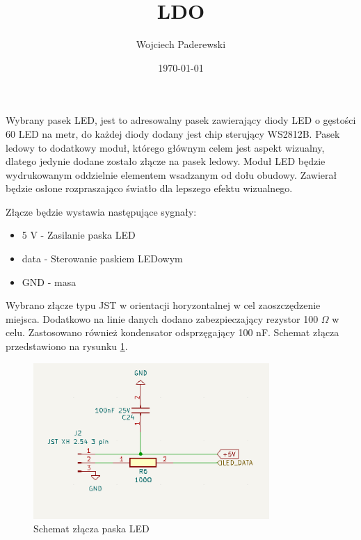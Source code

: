 \documentclass[../../main.tex]{subfiles}
\author{Wojciech Paderewski}
\date{\today}
\title{LDO}
\begin{document}
Wybrany pasek LED, jest to adresowalny pasek zawierający diody LED o gęstości 60 LED na metr, do każdej diody dodany jest chip sterujący WS2812B.
Pasek ledowy to dodatkowy moduł, którego głównym celem jest aspekt wizualny, dlatego jedynie dodane zostało złącze na pasek ledowy.
Moduł LED będzie wydrukowanym oddzielnie elementem wsadzanym od dołu obudowy. Zawierał będzie osłone rozpraszająco światło dla lepszego
efektu wizualnego.

Złącze będzie wystawia następujące sygnały:
\begin{itemize}
    \item 5 V - Zasilanie paska LED
    \item data - Sterowanie paskiem LEDowym
    \item GND - masa
\end{itemize}

Wybrano złącze typu JST w orientacji horyzontalnej w cel zaoszczędzenie miejsca. Dodatkowo na linie danych dodano zabezpieczający rezystor 100 $\Omega$ w celu.
Zastosowano również kondensator odsprzęgający 100 nF. Schemat złącza przedstawiono na rysunku \ref{fig:LED}.

\begin{figure}[H]
    \centering
    \includegraphics[width=0.8\textwidth]{LED.png}
    \caption{Schemat złącza paska LED}
    \label{fig:LED}
\end{figure}
\end{document}

